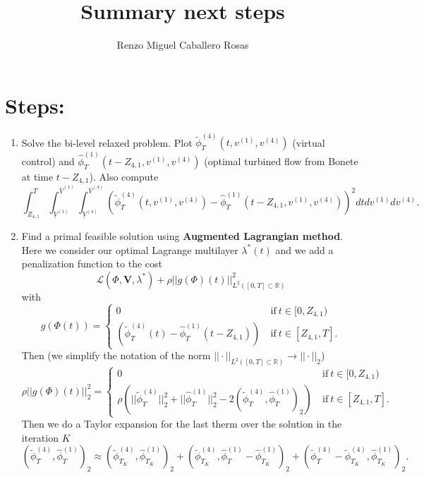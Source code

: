 \documentclass[12pt]{article}
\theoremstyle{definition}
\theoremstyle{remark}
\newcommand{\R}{\mathbb{R}}
\begin{document}
\title{Summary next steps}
\author{Renzo Miguel Caballero Rosas} 
\maketitle

\section{Steps:}

\begin{enumerate}

\item Solve the bi-level relaxed problem. Plot $\tilde{\phi}^{(4)}_T(t,v^{(1)},v^{(4)})$ (virtual control) and $\hat{\phi}^{(1)}_T(t-Z_{4,1},v^{(1)},v^{(4)})$ (optimal turbined flow from Bonete at time $t-Z_{4,1}$). Also compute
\begin{equation*}
\int_{Z_{4,1}}^T\int_{\underline{V}^{(1)}}^{\overline{V}^{(1)}}\int_{\underline{V}^{(4)}}^{\overline{V}^{(4)}}\left(\tilde{\phi}^{(4)}_T(t,v^{(1)},v^{(4)})-\hat{\phi}^{(1)}_T(t-Z_{4,1},v^{(1)},v^{(4)})\right)^2dtdv^{(1)}dv^{(4)}.
\end{equation*}

\item Find a primal feasible solution using \textbf{Augmented Lagrangian method}. Here we consider our optimal Lagrange multilayer $\lambda^*(t)$ and we add a penalization function to the cost
\begin{equation*}
\mathcal{L}(\Phi,\bm{V},\lambda^*)+\rho||g(\Phi)(t)||^2_{L^2([0,T]\subset\R)}
\end{equation*}
with
\begin{equation*}
g(\Phi(t))=\begin{cases}
0\ &\text{if}\ t\in[0,Z_{4,1})\\
\left(\tilde{\phi}^{(4)}_T(t)-\hat{\phi}^{(1)}_T(t-Z_{4,1})\right)\ &\text{if}\ t\in[Z_{4,1},T].
\end{cases}
\end{equation*}
Then (we simplify the notation of the norm $||\cdot||_{L^2([0,T]\subset\R)}\to||\cdot||_2$)
\begin{equation*}
\rho||g(\Phi)(t)||^2_2=\begin{cases}
0\ &\text{if}\ t\in[0,Z_{4,1})\\
\rho\left(||\tilde{\phi}^{(4)}_T||^2_2+||\hat{\phi}^{(1)}_T||^2_2-2\left(\tilde{\phi}^{(4)}_T,\hat{\phi}^{(1)}_T\right)_2\right)\ &\text{if}\ t\in[Z_{4,1},T].
\end{cases}
\end{equation*}
Then we do a Taylor expansion for the last therm over the solution in the iteration $K$
\begin{equation*}
\left(\tilde{\phi}^{(4)}_T,\hat{\phi}^{(1)}_T\right)_2\approx\left(\tilde{\phi}^{(4)}_{T_K},\hat{\phi}^{(1)}_{T_K}\right)_2+\left(\tilde{\phi}^{(4)}_{T_K},\hat{\phi}^{(1)}_T-\hat{\phi}^{(1)}_{T_K}\right)_2+\left(\tilde{\phi}^{(4)}_T-\tilde{\phi}^{(4)}_{T_K},\hat{\phi}^{(1)}_{T_K}\right)_2.
\end{equation*}


\end{enumerate}
\end{document}
